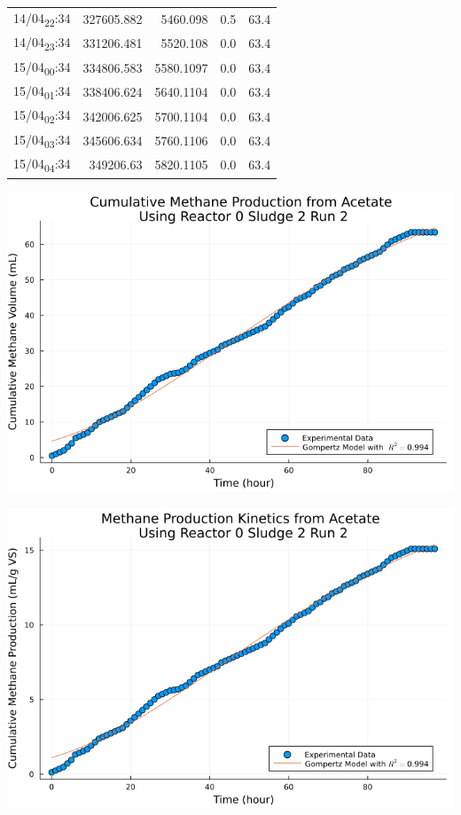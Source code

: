 \documentclass[11pt]{article}
\begin{document}
\begin{center}
\begin{tabular}{lrrrr}
14/04\textsubscript{22}:34 & 327605.882 & 5460.098 & 0.5 & 63.4\\[0pt]
14/04\textsubscript{23}:34 & 331206.481 & 5520.108 & 0.0 & 63.4\\[0pt]
15/04\textsubscript{00}:34 & 334806.583 & 5580.1097 & 0.0 & 63.4\\[0pt]
15/04\textsubscript{01}:34 & 338406.624 & 5640.1104 & 0.0 & 63.4\\[0pt]
15/04\textsubscript{02}:34 & 342006.625 & 5700.1104 & 0.0 & 63.4\\[0pt]
15/04\textsubscript{03}:34 & 345606.634 & 5760.1106 & 0.0 & 63.4\\[0pt]
15/04\textsubscript{04}:34 & 349206.63 & 5820.1105 & 0.0 & 63.4\\[0pt]
\end{tabular}
\end{center}

\begin{center}
\includegraphics[width=.9\linewidth]{../plots/BMPs/Acetate/methane_kinetics_acet_test_0_s2_2_hour.png}
\end{center}

\begin{center}
\includegraphics[width=.9\linewidth]{../plots/BMPs/Acetate/specific_methane_kinetics_acet_test_0_s2_2_hour.png}
\end{center}
\end{document}
